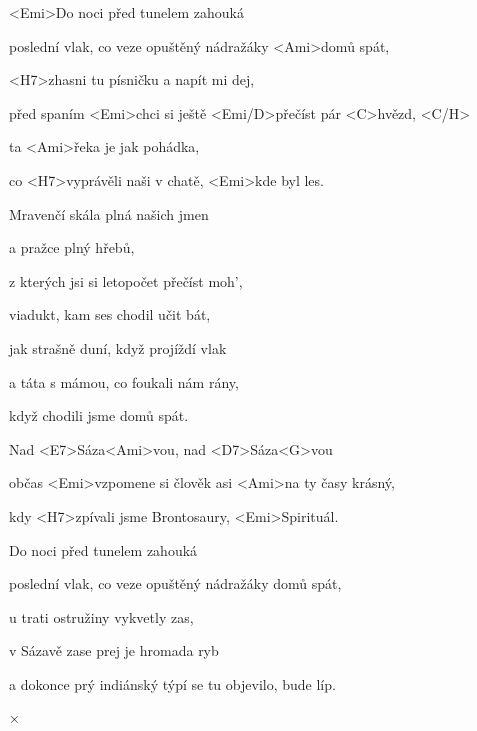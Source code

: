

\zs
<Emi>Do noci před tunelem zahouká

poslední vlak, co veze opuštěný nádražáky <Ami>domů spát,

<H7>zhasni tu písničku a napít mi dej,

před spaním <Emi>chci si ještě <Emi/D>přečíst pár <C>hvězd, <C/H>

ta <Ami>řeka je jak pohádka,

co <H7>vyprávěli naši v chatě, <Emi>kde byl les.
\ks

\zs
Mravenčí skála plná našich jmen

a pražce plný hřebů,

z kterých jsi si letopočet přečíst moh',

viadukt, kam ses chodil učit bát,

jak strašně duní, když projíždí vlak

a táta s mámou, co foukali nám rány,

když chodili jsme domů spát.
\ks

\zr
Nad <E7>Sáza<Ami>vou, nad <D7>Sáza<G>vou

občas <Emi>vzpomene si člověk asi <Ami>na ty časy krásný,

kdy <H7>zpívali jsme Brontosaury, <Emi>Spirituál.
\kr

\zs
Do noci před tunelem zahouká

poslední vlak, co veze opuštěný nádražáky domů spát,

u trati ostružiny vykvetly zas,

v Sázavě zase prej je hromada ryb

a dokonce prý indiánský týpí se tu objevilo, bude líp.
\ks

× \kr

\kp
